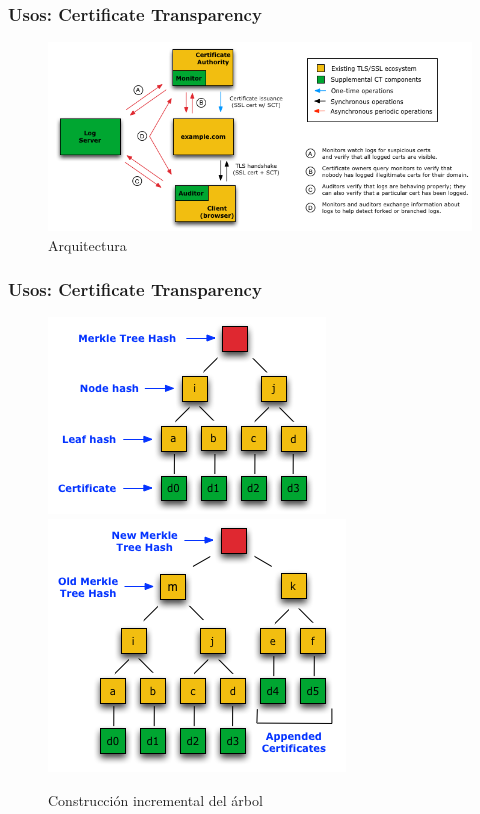 \documentclass[10pt, a4paper,english,spanish]{beamer}
\begin{document}
\begin{frame}
\frametitle{Usos: Certificate Transparency}

\begin{figure}
  \includegraphics[width=\linewidth]{imagenes/ct_system.png}
  \caption{Arquitectura}
\end{figure}

\end{frame}

\begin{frame}
\frametitle{Usos: Certificate Transparency}

\begin{figure}
\centering
  \includegraphics[width=.45\linewidth]{imagenes/ct_hash_1.png}
  \includegraphics[width=.45\linewidth]{imagenes/ct_hash_2.png}
  \caption{Construcci\'on incremental del \'arbol}
\end{figure}

\end{frame}
\end{document}
